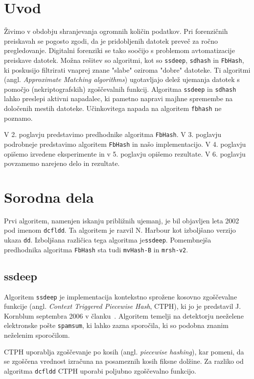 \documentclass{acm_proc_article-sp}
\begin{document}
\section{Uvod}
Živimo v obdobju shranjevanja ogromnih količin podatkov. Pri forenzičnih preiskavah se pogosto zgodi, da je pridobljenih datotek preveč za ročno pregledovanje. Digitalni forenziki se tako soočijo s problemom avtomatizacije preiskave datotek. Možna rešitev so algoritmi, kot so \texttt{ssdeep}, \texttt{sdhash} in \texttt{FbHash}, ki poskusijo filtrirati vnaprej znane "slabe" oziroma "dobre" datoteke. Ti algoritmi (angl. \emph{Approximate Matching algorithms}) ugotavljajo delež ujemanja datotek s pomočjo (nekriptografskih) zgoščevalnih funkcij. Algoritma \texttt{ssdeep} in \texttt{sdhash} lahko preslepi aktivni napadalec, ki pametno napravi majhne spremembe na določenih mestih datoteke. Učinkovitega napada na algoritem \texttt{fbhash} ne poznamo.\cite{fbhash}

V 2. poglavju predstavimo predhodnike algoritma \texttt{FbHash}. V 3. poglavju podrobneje predstavimo algoritem \texttt{FbHash} in našo implementacijo. V 4. poglavju opišemo izvedene eksperimente in  v 5. poglavju opišemo rezultate. V 6. poglavju povzamemo narejeno delo in rezultate.

\section{Sorodna dela}
Prvi algoritem, namenjen iskanju približnih ujemanj, je bil objavljen leta 2002 pod imenom \texttt{dcfldd}. Ta algoritem je razvil N. Harbour kot izboljšano verzijo ukaza \texttt{dd}\cite{dcfldd}. Izboljšana različica tega algoritma je\texttt{ssdeep}. Pomembnejša predhodnika algoritma \texttt{FbHash} sta tudi \texttt{mvHash-B} in \texttt{mrsh-v2}.

\subsection{ssdeep}
Algoritem \texttt{ssdeep} je implementacija kontekstno sprožene kosovno zgoščevalne funkcije (angl. \emph{Context Triggered Piecewise Hash}, CTPH), ki jo je predstavil J. Kornblum septembra 2006 v članku~\cite{kornblum:ctph}. Algoritem temelji na detektorju neeželene elektronske pošte \texttt{spamsum}, ki lahko zazna sporočila, ki so podobna znanim neželenim sporočilom.

CTPH uporablja zgoščevanje po kosih (angl. \emph{piecewise hashing}), kar pomeni, da se zgoščena vrednost izračuna na posameznih kosih fiksne dolžine. Za razliko od algoritma \texttt{dcfldd} CTPH uporabi poljubno zgoščevalno funkcijo.
\end{document}
